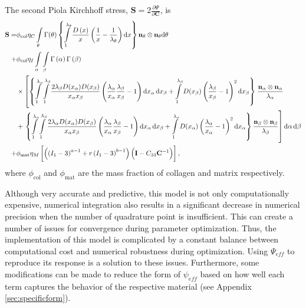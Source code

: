The second Piola Kirchhoff stress, $\mathbf{S}=2\frac{\partial\Psi}{\partial\mathbf{C}}$, is 
\begin{equation} \label{eqn:fullcollagen}
\begin{aligned}
\mathbf{S} = & \phi_\mathrm{col} \eta_C \int\displaylimits_\theta \Gamma(\theta)\left\lbrace 
\int\displaylimits_1^{\lambda_\theta} \frac{D\left( x \right)}{x} \left( \frac{1}{x}- \frac{1}{\lambda_\theta}\right) \mathrm{d}x \right\rbrace \mathbf{n}_\theta\otimes\mathbf{n}_\theta \mathrm{d}\theta \\
+ & \phi_\mathrm{col} \eta_I \int\displaylimits_\alpha \int\displaylimits_\beta \Gamma \left(\alpha \right) \Gamma \left( \beta \right) \\
& \times \left[ \left\lbrace 
\int\displaylimits_1^{\lambda_\alpha} \int\displaylimits_1^{\lambda_\beta} 
\frac{2 \lambda_\beta D(x_\alpha) D(x_\beta)}{x_\alpha x_\beta} 
\left( \frac{\lambda_\alpha}{x_\alpha} \frac{\lambda_\beta}{x_\beta} - 1\right) \mathrm{d}x_\alpha \, \mathrm{d}x_\beta 
+\int\displaylimits_1^{\lambda_\beta} D(x_\beta) \left( \frac{\lambda_\beta}{x_\beta} -1  \right)^2 \mathrm{d}x_\beta \right\rbrace \right.  \frac{\mathbf{n}_\alpha \otimes \mathbf{n}_\alpha}{\lambda_\alpha}  \\
& + \left. \left\lbrace
\int\displaylimits_1^{\lambda_\alpha} \int\displaylimits_1^{\lambda_\beta} 
\frac{2 \lambda_\alpha D(x_\alpha) D(x_\beta)}{x_\alpha x_\beta} 
\left( \frac{\lambda_\alpha}{x_\alpha} \frac{\lambda_\beta}{x_\beta} - 1\right) \mathrm{d}x_\alpha \, \mathrm{d}x_\beta 
+ \int\displaylimits_1^{\lambda_\alpha} D(x_\alpha) \left( \frac{\lambda_\alpha}{x_\alpha} -1  \right)^2 \mathrm{d}x_\alpha \right\rbrace \frac{\mathbf{n}_\beta \otimes \mathbf{n}_\beta}{\lambda_\beta}  \right] \mathrm{d}\alpha \, \mathrm{d}\beta\\
+ & \phi_\mathrm{mat} \eta_M \left[\left(\left( I_1 - 3\right)^{a - 1} + r \left( I_1 - 3\right)^{b - 1}\right) \left( \mathbf{I} - C_{33}\mathbf{C}^{-1}\right)  \right],\\
\end{aligned}
\end{equation}
    where $\phi_\mathrm{col}$ and $\phi_\mathrm{mat}$ are the mass fraction of collagen and matrix respectively. 
    
	Although very accurate and predictive, this model is not only computationally expensive, numerical integration also results in a significant decrease in numerical precision when the number of quadrature point is insufficient. This can create a number of issues for convergence during parameter optimization. Thus, the implementation of this model is complicated by a constant balance between computational cost and numerical robustness during optimization. Using $\Psi_{eff}$ to reproduce its response is a solution to these issues. Furthermore, some modifications can be made to reduce the form of $\psi_{eff}$ based on how well each term captures the behavior of the respective material (see Appendix \ref{sec:specificform}).
    
